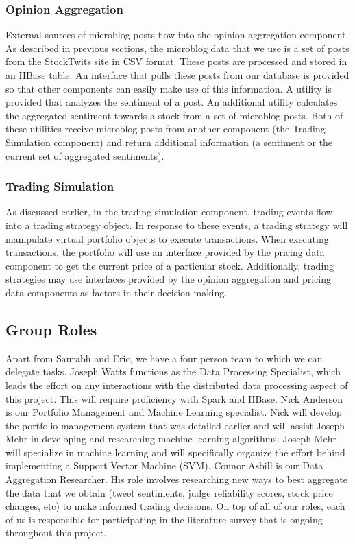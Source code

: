 \subsubsection{Opinion Aggregation}

External sources of microblog posts flow into the opinion aggregation component.
As described in previous sections, the microblog data that we use is a set of posts from the StockTwits site in CSV format.
These posts are processed and stored in an HBase table.
An interface that pulls these posts from our database is provided so that other components can easily make use of this information.
A utility is provided that analyzes the sentiment of a post.
An additional utility calculates the aggregated sentiment towards a stock from a set of microblog posts.
Both of these utilities receive microblog posts from another component (the Trading Simulation component) and return additional information (a sentiment or the current set of aggregated sentiments).

\subsubsection{Trading Simulation}

As discussed earlier, in the trading simulation component, trading events flow into a trading strategy object.
In response to these events, a trading strategy will manipulate virtual portfolio objects to execute transactions.
When executing transactions, the portfolio will use an interface provided by the pricing data component to get the current price of a particular stock.
Additionally, trading strategies may use interfaces provided by the opinion aggregation and pricing data components as factors in their decision making.

\subsection{Group Roles}

Apart from Saurabh and Eric, we have a four person team to which we can delegate tasks.
Joseph Watts functions as the Data Processing Specialist, which leads the effort on any interactions with the distributed data processing aspect of this project.
This will require proficiency with Spark and HBase.
Nick Anderson is our Portfolio Management and Machine Learning specialist.
Nick will develop the portfolio management system that was detailed earlier and will assist Joseph Mehr in developing and researching machine learning algorithms.
Joseph Mehr will specialize in machine learning and will specifically organize the effort behind implementing a Support Vector Machine (SVM).
Connor Asbill is our Data Aggregation Researcher.
His role involves researching new ways to best aggregate the data that we obtain (tweet sentiments, judge reliability scores, stock price changes, etc) to make informed trading decisions.
On top of all of our roles, each of us is responsible for participating in the literature survey that is ongoing throughout this project.

